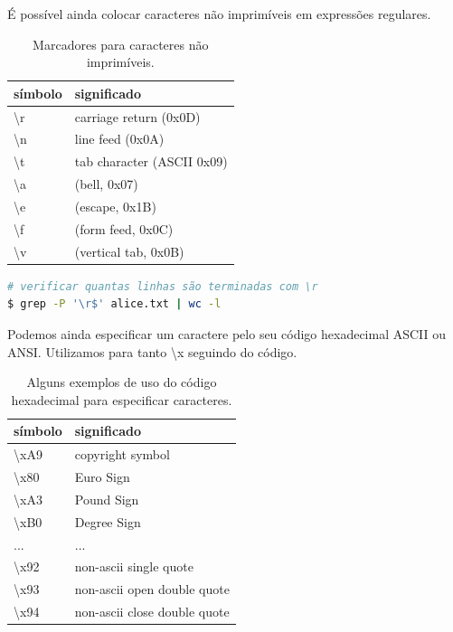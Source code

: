 \begin{frame}
\framebreak
É possível  ainda colocar caracteres não imprimíveis em expressões regulares.

\begin{table}
\caption{Marcadores para caracteres não imprimíveis.}\label{tab-regex-npc}
\begin{tabular}{ll}
símbolo & significado \\
\midrule
\textbackslash r  &    carriage return (0x0D)          \\ 
\textbackslash n  &    line feed (0x0A)                \\
\textbackslash t  &    tab character (ASCII 0x09)      \\
\textbackslash a  &    (bell, 0x07)                    \\
\textbackslash e  &    (escape, 0x1B)                  \\
\textbackslash f  &    (form feed, 0x0C)               \\
\textbackslash v  &    (vertical tab, 0x0B)            \\
\end{tabular}
\end{table}


\begin{lstlisting}[language=bash, label=lst-grep-06, caption={Contexto.}, postbreak=\mbox{$\hookrightarrow$\space}, basicstyle=\fontsize{8}{10}\selectfont\ttfamily]
# verificar quantas linhas são terminadas com \r
$ grep -P '\r$' alice.txt | wc -l
\end{lstlisting}

\framebreak

Podemos ainda especificar um caractere pelo seu código hexadecimal ASCII ou ANSI.
Utilizamos para tanto \textbackslash x seguindo do código. 

\begin{table}
\caption{Alguns exemplos de uso do código hexadecimal para especificar caracteres.}\label{tab-regex-hex}
\begin{tabular}{ll}
símbolo & significado \\
\midrule
\textbackslash xA9 & copyright symbol    \\
\textbackslash x80 & Euro Sign           \\
\textbackslash xA3 & Pound Sign          \\
\textbackslash xB0 & Degree Sign         \\
...   &  ...                \\
\textbackslash x92 & non-ascii single quote \\
\textbackslash x93 & non-ascii open double quote \\
\textbackslash x94 & non-ascii close double quote\\
\end{tabular}
\end{table}


\end{frame}
